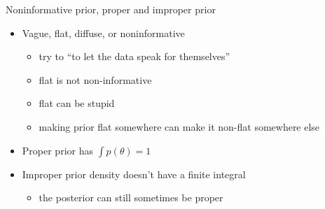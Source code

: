 \documentclass[english,t]{beamer}
\DeclareMathOperator{\Bin}{Bin}
\begin{document}

\begin{frame}{Noninformative prior, proper and improper prior}

  \begin{itemize}
  \item Vague, flat, diffuse, or noninformative
    \begin{itemize}
    \item try to ``to let the data speak for themselves''
    \item flat is not non-informative
    \item flat can be stupid
    \item making prior flat somewhere can make it non-flat somewhere
      else
    \end{itemize}
  \item Proper prior has $\int p(\theta) = 1$
  \item Improper prior density doesn't have a finite integral
    \begin{itemize}
    \item the posterior can still sometimes be proper
    \end{itemize}
  \end{itemize}
  
\end{frame}



\end{document}
